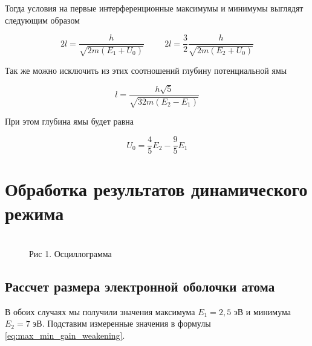 \documentclass[12pt]{article}
\begin{document}
    Тогда условия на первые интерференционные максимумы и минимумы выглядят
    следующим образом

    \begin{equation}
      2 l = \frac{h}{\sqrt{2 m \left(E_1 + U_0\right)}}
      \hspace{1cm}
      2 l = \frac{3}{2} \frac{h}{\sqrt{2 m \left(E_2 + U_0\right)}}
      \label{eq:max_min_gain_weakening}
    \end{equation}

    Так же можно исключить из этих соотношений глубину потенциальной ямы

    \begin{equation}
      l = \frac{h \sqrt{5}}{\sqrt{32 m \left( E_2 - E_1 \right)}}
      \label{eq:atom_size}
    \end{equation}

    При этом глубина ямы будет равна

    \begin{equation}
      U_0 = \frac{4}{5} E_2 - \frac{9}{5} E_1
      \label{eq:potential_pit_depth}
    \end{equation}

  \section{Обработка результатов динамического режима}

  \begin{figure}[h!]
    \\
    Рис 1. Осциллограмма
    \label{fig:oscillograme}
  \end{figure}

    \subsection{Рассчет размера электронной оболочки атома}

      В обоих случаях мы получили значения максимума $E_1 = 2,5$ эВ и
      минимума $E_2 = 7$ эВ. Подставим измеренные значения в формулы
      \ref{eq:max_min_gain_weakening}.
\end{document}
